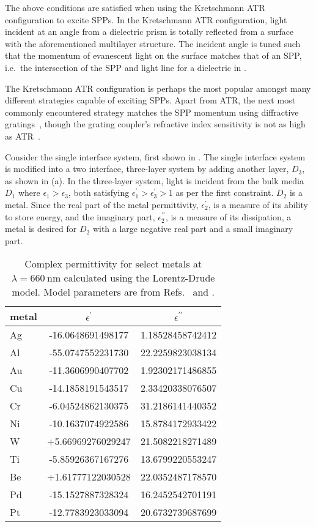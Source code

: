 The above conditions are satisfied when using the Kretschmann ATR
configuration to excite SPPs.  In the Kretschmann ATR configuration, light
incident at an angle from a dielectric prism is totally reflected from a
surface with the aforementioned multilayer structure.  The incident angle
is tuned such that the momentum of evanescent light on the surface matches
that of an SPP, i.e.\ the intersection of the SPP and light line
for a dielectric in .

The Kretschmann ATR configuration is perhaps the most popular amongst many
different strategies capable of exciting SPPs.  Apart from ATR, the next
most commonly encountered strategy matches the SPP momentum using
diffractive gratings~\cite{homola1999surface}, though the grating coupler's
refractive index sensitivity is not as high as
ATR~\cite{homola1999senscomparison}.

Consider the single interface system, first shown in
.  The single interface system is modified
into a two interface, three-layer system by adding another layer, $D_3$, as
shown in (a).  In the three-layer system,
light is incident from the bulk media $D_1$ where $\epsilon_1>\epsilon_3$,
both satisfying $\epsilon^\prime_1>\epsilon^\prime_3>1$ as per the first
constraint.  $D_2$ is a metal.  Since the real part of the metal
permittivity, $\epsilon_2^\prime$, is a measure of its ability to store
energy, and the imaginary part, $\epsilon_2^{\prime\prime}$, is a measure of
its dissipation, a metal is desired for $D_2$ with a large negative real
part and a small imaginary part.
\begin{table}[ht]
\centering
{}
\begin{tabular}{lSS}
\toprule
metal & {$\epsilon^\prime$} & {$\epsilon^{\prime\prime}$} \\
\midrule
Ag & -16.0648691498177 & 1.18528458742412\\
Al & -55.0747552231730 & 22.2259823038134\\
Au & -11.3606990407702 & 1.92302171486855\\
Cu & -14.1858191543517 & 2.33420338076507\\
Cr & -6.04524862130375 & 31.2186141440352\\
Ni & -10.1637074922586 & 15.8784172933422\\
W  & +5.66969276029247 & 21.5082218271489\\
Ti & -5.85926367167276 & 13.6799220553247\\
Be & +1.61777122030528 & 22.0352487178570\\
Pd & -15.1527887328324 & 16.2452542701191\\
Pt & -12.7783923033094 & 20.6732739687699\\
\bottomrule
\end{tabular}
\caption{Complex permittivity for select metals at
$\lambda=\SI{660}{\nano\meter}$ calculated using the Lorentz-Drude
model.  Model parameters are from Refs.~\cite{ung2007interference} and
\cite{rakic1998optical}.}
\label{tbl:epsmetal600}
\end{table}

